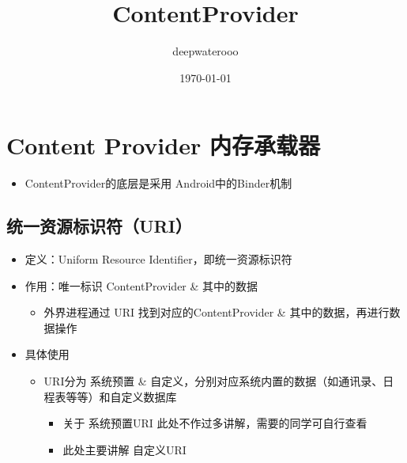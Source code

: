 \documentclass[9pt, b5paper]{article}
\author{deepwaterooo}
\date{\today}
\title{ContentProvider}
\begin{document}
\maketitle
\tableofcontents


\section{Content Provider 内存承载器}
\label{sec-1}
\begin{itemize}
\item ContentProvider的底层是采用 Android中的Binder机制
\end{itemize}
\subsection{统一资源标识符（URI）}
\label{sec-1-1}
\begin{itemize}
\item 定义：Uniform Resource Identifier，即统一资源标识符
\item 作用：唯一标识 ContentProvider \& 其中的数据
\begin{itemize}
\item 外界进程通过 URI 找到对应的ContentProvider \& 其中的数据，再进行数据操作
\end{itemize}
\item 具体使用
\begin{itemize}
\item URI分为 系统预置 \& 自定义，分别对应系统内置的数据（如通讯录、日程表等等）和自定义数据库
\begin{itemize}
\item 关于 系统预置URI 此处不作过多讲解，需要的同学可自行查看
\item 此处主要讲解 自定义URI
\end{itemize}
\end{itemize}
\end{itemize}
\end{document}
